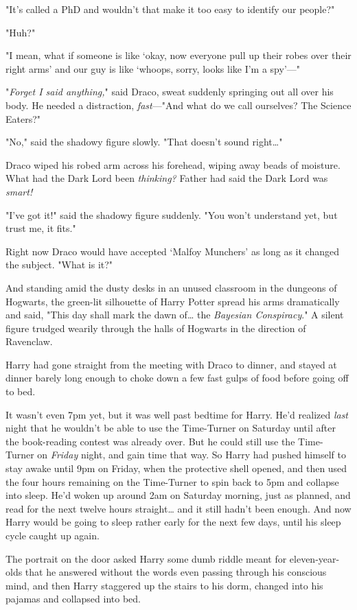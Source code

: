 "It's called a PhD and wouldn't that make it too easy to identify our people?"

"Huh?"

"I mean, what if someone is like `okay, now everyone pull up their robes over
their right arms' and our guy is like `whoops, sorry, looks like I'm a spy'---"

"\emph{Forget I said anything,}" said Draco, sweat suddenly springing out all
over his body. He needed a distraction, \emph{fast}---"And what do we call
ourselves? The Science Eaters?"

"No," said the shadowy figure slowly. "That doesn't sound right{\ldots}"

Draco wiped his robed arm across his forehead, wiping away beads of moisture.
What had the Dark Lord been \emph{thinking?} Father had said the Dark Lord was
\emph{smart!}

"I've got it!" said the shadowy figure suddenly. "You won't understand yet, but
trust me, it fits."

Right now Draco would have accepted `Malfoy Munchers' as long as it changed the
subject. "What is it?"

And standing amid the dusty desks in an unused classroom in the dungeons of
Hogwarts, the green-lit silhouette of Harry Potter spread his arms dramatically
and said, "This day shall mark the dawn of{\ldots} the \emph{Bayesian
Conspiracy}."
\later
A silent figure trudged wearily through the halls of Hogwarts in the direction
of Ravenclaw.

Harry had gone straight from the meeting with Draco to dinner, and stayed at
dinner barely long enough to choke down a few fast gulps of food before going
off to bed.

It wasn't even 7pm yet, but it was well past bedtime for Harry. He'd realized
\emph{last} night that he wouldn't be able to use the Time-Turner on Saturday
until after the book-reading contest was already over. But he could still use
the Time-Turner on \emph{Friday} night, and gain time that way. So Harry had
pushed himself to stay awake until 9pm on Friday, when the protective shell
opened, and then used the four hours remaining on the Time-Turner to spin back
to 5pm and collapse into sleep. He'd woken up around 2am on Saturday morning,
just as planned, and read for the next twelve hours straight{\ldots} and it
still hadn't been enough. And now Harry would be going to sleep rather early
for the next few days, until his sleep cycle caught up again.

The portrait on the door asked Harry some dumb riddle meant for
eleven-year-olds that he answered without the words even passing through his
conscious mind, and then Harry staggered up the stairs to his dorm,
changed into his pajamas and collapsed into bed.

